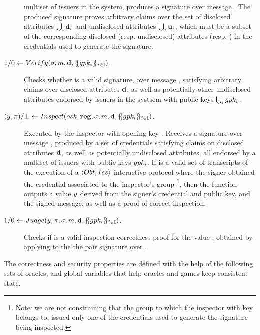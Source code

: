 \begin{description}
  multiset of issuers in the system, produces a signature \sig over message
  \msg. The produced signature proves arbitrary claims over the set of
  disclosed attributes $\bigcup_i \mathbf{d}_i$ and undisclosed attributes
  $\bigcup_i \mathbf{u}_i$, which must be a subset of the corresponding disclosed
  (resp. undisclosed) attributes \tdattrs (resp. \tuattrs) in the credentials
  used to generate the signature.
\item[$1/0 \gets
  Verify(\sigma,m,\mathbf{d}, \{\mskip-5mu\{ gpk_i \}\mskip-5mu\}_{i \in \mathbb{I}})$.]
  Checks whether \sig is a valid signature, over message \msg, satisfying
  arbitrary claims over disclosed attributes $\mathbf{d}$, as well as
  potentially other undisclosed attributes endorsed by issuers in the systsem
  with public keys $\bigcup_i gpk_i$.
\item[$(y,\pi)/\bot \gets
  Inspect(osk,\mathbf{reg},\sigma,m,\mathbf{d},
  \{\mskip-5mu\{ gpk_i \}\mskip-5mu\}_{i \in \mathbb{I}})$.] %
  Executed by the inspector with opening key \osk. Receives a signature \sig
  over message \msg, produced by a set of credentials satisfying claims on
  disclosed attributes $\mathbf{d}$, as well as potentially undisclosed
  attributes, all endorsed by a multiset of issuers with public keys $gpk_i$. 
  If \trans is a valid set of transcripts of the execution of a
  $\langle Obt,Iss\rangle$ interactive protocol where the signer obtained
  the credential associated to the inspector's group%
  \footnote{Note: we are not constraining that the group to which the inspector
    with key \osk belongs to, issued only one of the credentials used to
    generate the signature being inspected.}, then the function outputs
  a value $y$ derived from the signer's credential and public key, and the
  signed message, as well as a proof of correct inspection.
\item[$1/0 \gets Judge(y,\pi,\sigma,m,\mathbf{d},
  \{\mskip-5mu\{ gpk_i\}\mskip-5mu\}_{i \in \mathbb{I}})$.] %
  Checks if \iproof is a valid inspection correctness proof for the value \y,
  obtained by applying \Inspect to the the pair signature \sig over \msg. 
\end{description}

The correctness and security properties are defined with the help of the
following sets of oracles, and global variables that help oracles and games
keep consistent state.

